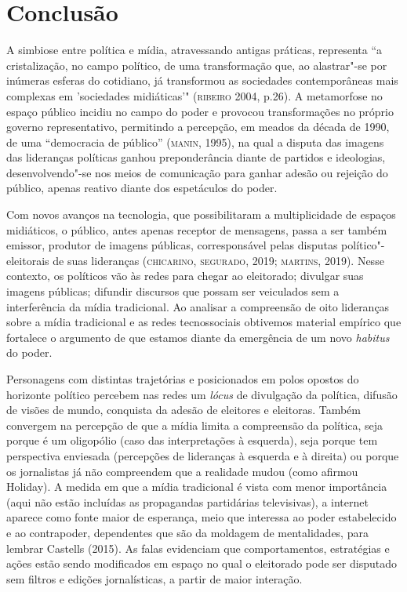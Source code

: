 \section{Conclusão}

A simbiose entre política e mídia, atravessando antigas práticas,
representa ``a cristalização, no campo político, de uma transformação
que, ao alastrar"-se por inúmeras esferas do cotidiano, já transformou as
sociedades contemporâneas mais complexas em 'sociedades midiáticas'"
(\textsc{ribeiro} 2004, p.26). A metamorfose no espaço público incidiu no campo
do poder e provocou transformações no próprio governo representativo,
permitindo a percepção, em meados da década de 1990, de uma ``democracia
de público'' (\textsc{manin}, 1995), na qual a disputa das imagens das lideranças
políticas ganhou preponderância diante de partidos e ideologias,
desenvolvendo"-se nos meios de comunicação para ganhar adesão ou rejeição
do público, apenas reativo diante dos espetáculos do poder.

Com novos avanços na tecnologia, que possibilitaram a multiplicidade de
espaços midiáticos, o público, antes apenas receptor de mensagens, passa
a ser também emissor, produtor de imagens públicas, corresponsável pelas
disputas político"-eleitorais de suas lideranças (\textsc{chicarino}, \textsc{segurado},
2019; \textsc{martins}, 2019). Nesse contexto, os políticos vão às redes para
chegar ao eleitorado; divulgar suas imagens públicas; difundir discursos
que possam ser veiculados sem a interferência da mídia tradicional. Ao
analisar a compreensão de oito lideranças sobre a mídia tradicional e as
redes tecnossociais obtivemos material empírico que fortalece o
argumento de que estamos diante da emergência de um novo \emph{habitus}
do poder.

Personagens com distintas trajetórias e posicionados em polos opostos do
horizonte político percebem nas redes um \emph{lócus} de divulgação da
política, difusão de visões de mundo, conquista da adesão de eleitores e
eleitoras. Também convergem na percepção de que a mídia limita a
compreensão da política, seja porque é um oligopólio (caso das
interpretações à esquerda), seja porque tem perspectiva enviesada
(percepções de lideranças à esquerda e à direita) ou porque os
jornalistas já não compreendem que a realidade mudou (como afirmou
Holiday). A medida em que a mídia tradicional é vista com menor
importância (aqui não estão incluídas as propagandas partidárias
televisivas), a internet aparece como fonte maior de esperança, meio que
interessa ao poder estabelecido e ao contrapoder, dependentes que são da
moldagem de mentalidades, para lembrar Castells (2015). As falas
evidenciam que comportamentos, estratégias e ações estão sendo
modificados em espaço no qual o eleitorado pode ser disputado sem
filtros e edições jornalísticas, a partir de maior interação.

